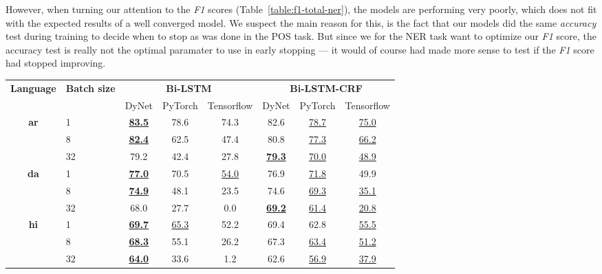 However, when turning our attention to the \textit{F1} scores
(Table~\ref{table:f1-total-ner}), the models are performing very poorly, which
does not fit with the expected results of a well converged model. We suspect the
main reason for this, is the fact that our models did the same \textit{accuracy}
test during training to decide when to stop as was done in the POS task. But
since we for the NER task want to optimize our \textit{F1} score, the accuracy
test is really not the optimal paramater to use in early stopping --- it would
of course had made more sense to test if the \textit{F1} score had stopped
improving.

\begin{table}[h!]
    \centering
    \begin{tabular}{c l c c c|c c c}
        \toprule
        \multirow{2}{*}{\bfseries Language} &
        \multirow{2}{*}{\bfseries Batch size} &
        \multicolumn{3}{c}{\bfseries Bi-LSTM} &
        \multicolumn{3}{c}{\bfseries Bi-LSTM-CRF} \\
        \cmidrule(lr){3-8}
        && DyNet & PyTorch & Tensorflow & DyNet & PyTorch & Tensorflow \\

        \cmidrule(lr){1-8}
        \multirow{3}{*}{\bfseries ar}
        &  1 & 
        \underline{\textbf{83.5}} & 78.6 & 74.3 &
        82.6 & \underline{78.7} & \underline{75.0} \\
        &  8 & 
        \underline{\textbf{82.4}} & 62.5 & 47.4 &
        80.8 & \underline{77.3} & \underline{66.2} \\
        & 32 & 
        79.2 & 42.4 & 27.8 &
        \underline{\textbf{79.3}} & \underline{70.0} & \underline{48.9} \\

        \cmidrule(lr){1-8}
        \multirow{3}{*}{\bfseries da}
        &  1 &
        \underline{\textbf{77.0}} & 70.5 & \underline{54.0} &
        76.9 & \underline{71.8} & 49.9 \\
        &  8 &
        \underline{\textbf{74.9}} & 48.1 & 23.5 &
        74.6 & \underline{69.3} & \underline{35.1} \\
        & 32 &
        68.0 & 27.7 &  0.0 &
        \underline{\textbf{69.2}} & \underline{61.4} & \underline{20.8} \\

        \cmidrule(lr){1-8}
        \multirow{3}{*}{\bfseries hi}
        &  1 &
        \underline{\textbf{69.7}} & \underline{65.3} & 52.2 &
        69.4 & 62.8 & \underline{55.5} \\
        &  8 &
        \underline{\textbf{68.3}} & 55.1 & 26.2 &
        67.3 & \underline{63.4} & \underline{51.2} \\
        & 32 &
        \underline{\textbf{64.0}} & 33.6 &  1.2 &
        62.6 & \underline{56.9} & \underline{37.9} \\


\end{tabular}
\end{table}
